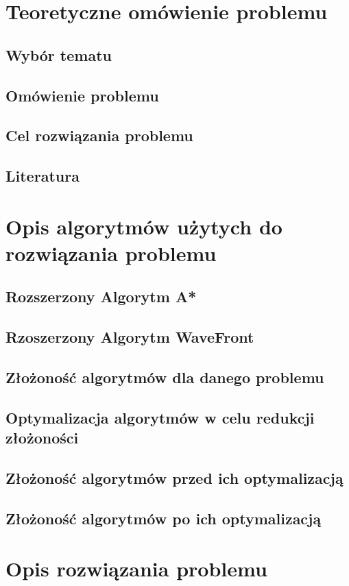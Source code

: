 \documentclass{article}
\begin{document}
  \newpage
  \tableofcontents
  \section{Teoretyczne omówienie problemu}
  \subsection{Wybór tematu}
  \subsection{Omówienie problemu}
  \subsection{Cel rozwiązania problemu}
  \subsection{Literatura}

  \section{Opis algorytmów użytych do rozwiązania problemu}
  \subsection{Rozszerzony Algorytm A*}
  \subsection{Rzoszerzony Algorytm WaveFront}
  \subsection{Złożoność algorytmów dla danego problemu}
  \subsection{Optymalizacja algorytmów w celu redukcji złożoności}
  \subsection{Złożoność algorytmów przed ich optymalizacją}
  \subsection{Złożoność algorytmów po ich optymalizacją}

  \section{Opis rozwiązania problemu}
\end{document}
